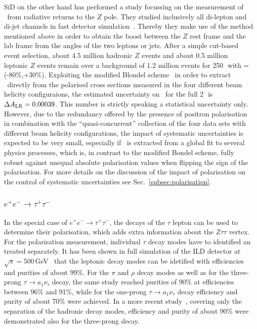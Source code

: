 SiD on the other hand has performed a study focussing on the measurement of \ALR\ from radiative returns to the $Z$ pole. They studied inclusively all di-lepton and di-jet channels in fast detector simulation~\cite{bib:ueno_lcws18}. Thereby they make use of the method mentioned above in order to obtain the boost between the $Z$ rest frame and the lab frame from the angles of the two leptons or jets. After a simple cut-based event selection, about 4.5 million hadronic $Z$ events and about 0.5 million leptonic $Z$ events remain over a background of 1.2 million events for 250\,\ifb\ with \Pmp=(-80\%,+30\%). Exploiting the modified Blondel scheme~\cite{Blondel:1987wr, Monig:2001db} in order to extract \ALR\ directly from the polarised cross sections measured in the four different beam helicity configuraions, the estimated uncertainty on \ALR\ for the full 2\,\iab\ is $\Delta A_{\mathrm{LR}} = 0.00039$. This number is strictly speaking a statistical uncertainty only. However, due to the redundancy offered by the presence of positron polarisation in combination with the ``quasi-concurrent'' collection of the four data sets with different beam helicity configurations, the impact of systematic uncertainties is expected to be very small, especially if \ALR\ is extracted from a global fit to several physics processes, which is, in contrast to the modified Bondel scheme, fully robust against unequal absolute polarisation values when flipping the sign of the polarisation.
For more details on the discussion of the impact of polarisation on the control of systematic uncertainties see Sec.~\ref{subsec:polarisation}.

\subsubsection{$e^+e^- \to \tau^+\tau^-$}
In the special case of $e^+e^- \to \tau^+\tau^-$, the decays of the $\tau$ lepton can be used to determine their polarisation, which adds extra information about the $Z \tau \tau$ vertex. For the polarisation measurement, individual $\tau$ decay modes have to identified an treated separately.
It has been shown in full simulation of the ILD detector at $\sqrt{s}=500$\,GeV~\cite{Behnke:2013lya, Suehara:2009nj} that the leptonic decay modes can be idetified with efficiencies and purities of about 99\%. For the $\pi$ and $\rho$  decay modes as well as for the three-prong $\tau \to a_1 \nu_{\tau}$ decay, the same study reached purities of 90\% at efficiencies between 96\% and 91\%, while for the one-prong $\tau \to a_1 \nu_{\tau}$ decay efficiency and purity of about 70\% were achieved. In a more recent study~\cite{Tran:2015nxa}, covering only the separation of the hadronic decay modes, efficiency and purity of about 90\% were demonstrated also for the three-prong decay. 

